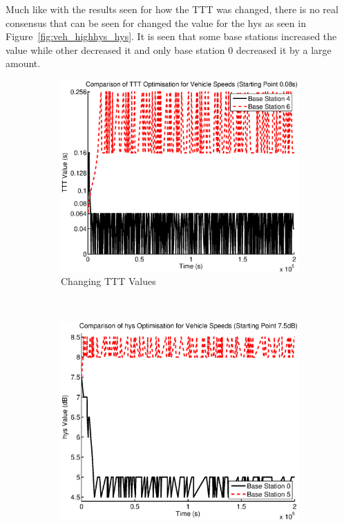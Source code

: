Much like with the results seen for how the TTT was changed, there is no real consensus that can be seen for changed the value for the hys as seen in Figure~\ref{fig:veh_highhys_hys}. It is seen that some base stations increased the value while other decreased it and only base station 0 decreased it by a large amount.
\begin{figure}[H]
        \centering
        \begin{subfigure}[b]{0.49\textwidth}
                \includegraphics[width=\textwidth]{figures/vehicle_figures/highhys/long_ttt.eps}
                \caption{Changing TTT Values}
                \label{fig:veh_highhys_ttt}
        \end{subfigure}%
        ~ %
        \begin{subfigure}[b]{0.49\textwidth}
                \includegraphics[width=\textwidth]{figures/vehicle_figures/highhys/long_hys.eps}

\end{subfigure}
\end{figure}
